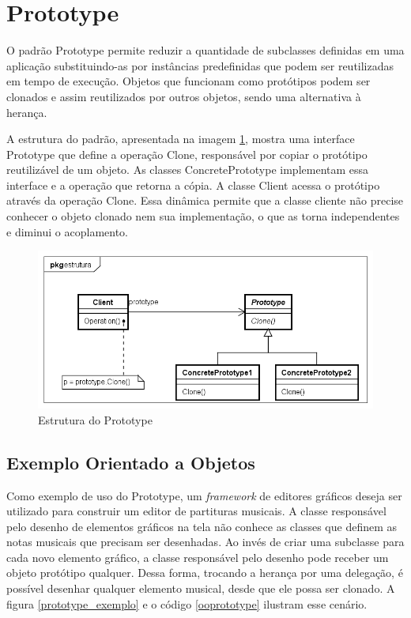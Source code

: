 \section{Prototype}

O padrão Prototype permite reduzir a quantidade 
de subclasses definidas em uma aplicação 
substituindo-as por instâncias predefinidas 
que podem ser reutilizadas em tempo de 
execução. Objetos que funcionam como 
protótipos podem ser clonados e assim 
reutilizados por outros objetos, sendo uma 
alternativa à herança. \cite{gamma:1995}

A estrutura do padrão, apresentada na imagem 
\ref{prototype_struct}, mostra uma interface 
Prototype que define a operação Clone, responsável 
por copiar o protótipo reutilizável de um objeto. 
As classes ConcretePrototype implementam essa 
interface e a operação que retorna a cópia. 
A classe Client acessa o protótipo através da operação 
Clone. Essa dinâmica permite que a classe cliente 
não precise conhecer o objeto clonado nem sua 
implementação, o que as torna independentes e 
diminui o acoplamento.

\begin{figure}[htb]
	\caption{\label{prototype_struct}Estrutura do Prototype}
	\begin{center}
	    \includegraphics[scale=0.5]{5_padroes-contexto-funcional/5.1_criacionais/5.1.4_prototype/prototype_estrutura.png}
	\end{center}
\end{figure}


\subsection*{Exemplo Orientado a Objetos}

Como exemplo de uso do Prototype, um 
\textit{framework} de editores gráficos deseja 
ser utilizado para construir um editor de 
partituras musicais. A classe responsável pelo 
desenho de elementos gráficos na tela não 
conhece as classes que definem as notas musicais que 
precisam ser desenhadas. Ao invés de criar uma 
subclasse para cada novo elemento gráfico, 
a classe responsável pelo desenho 
pode receber um objeto protótipo qualquer. 
Dessa forma, trocando a herança 
por uma delegação, é possível desenhar qualquer 
elemento musical, desde que ele possa ser 
clonado. A figura \ref{prototype_exemplo} e 
o código \ref{ooprototype} ilustram esse cenário.

